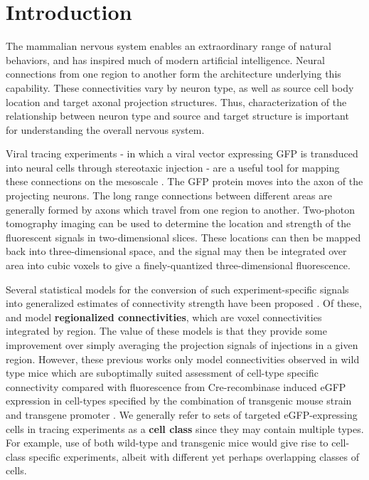 \section{Introduction}
 
The mammalian nervous system enables an extraordinary range of natural behaviors, and has inspired much of modern artificial intelligence.
Neural connections from one region to another form the architecture underlying this capability.
These connectivities vary by neuron type, as well as source cell body location and target axonal projection structures.
Thus, characterization of the relationship between neuron type and source and target structure is important for understanding the overall nervous system.

Viral tracing experiments - in which a viral vector expressing GFP is transduced into neural cells through stereotaxic injection - are a useful tool for mapping these connections on the mesoscale \citep{Chamberlin1998-hi,Harris2012-fw, Daigle2018-gd}.
The GFP protein moves into the axon of the projecting neurons. The long range connections between different areas are generally formed by axons which travel from one region to another. 
Two-photon tomography imaging can be used to determine the location and strength of the fluorescent signals in two-dimensional slices.
These locations can then be mapped back into three-dimensional space, and the signal may then be integrated over area into cubic voxels to give a finely-quantized three-dimensional fluorescence.

Several statistical models for the conversion of such experiment-specific signals into generalized estimates of connectivity strength have been proposed \citep{Oh2014-kh, Harris2016-fn, Gamanut2018-sd, Knox2019-ot}.
Of these, \citet{Oh2014-kh} and \citet{Knox2019-ot} model \textbf{regionalized connectivities}, which are voxel connectivities integrated by region.
The value of these models is that they provide some improvement over simply averaging the projection signals of injections in a given region.
However, these previous works only model connectivities observed in wild type mice which are suboptimally suited assessment of cell-type specific connectivity compared with fluorescence from Cre-recombinase induced eGFP expression in cell-types specified by the combination of transgenic mouse strain and transgene promoter \citep{Harris2019-mr}.
We generally refer to sets of targeted eGFP-expressing cells in tracing experiments as a \textbf{cell class} since they may contain multiple types.
For example, use of both wild-type and transgenic mice would give rise to cell-class specific experiments, albeit with different yet perhaps overlapping classes of cells.

